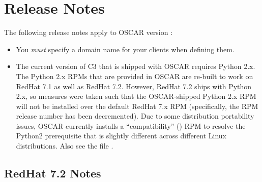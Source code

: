 %
%
%

\section{Release Notes}
\label{sec:release-notes}

The following release notes apply to OSCAR version \oscarversion:

\begin{itemize}
\item You {\em must} specify a domain name for your clients when
  defining them.
  
\item The current version of C3 that is shipped with OSCAR requires
  Python 2.x.  The Python 2.x RPMs that are provided in OSCAR are
  re-built to work on RedHat 7.1 as well as RedHat 7.2.  However,
  RedHat 7.2 ships with Python 2.x, so measures were taken such that
  the OSCAR-shipped Python 2.x RPM will not be installed over the
  default RedHat 7.x RPM (specifically, the RPM release number has
  been decremented).  Due to some distribution portability issues,
  OSCAR currently installs a ``compatibility''
  () RPM to resolve the Python2
  prerequisite that is slightly different across different Linux
  distributions.  Also see the file
  .
\end{itemize}


\subsection{RedHat 7.2 Notes}
\label{subsec:rh72notes}


